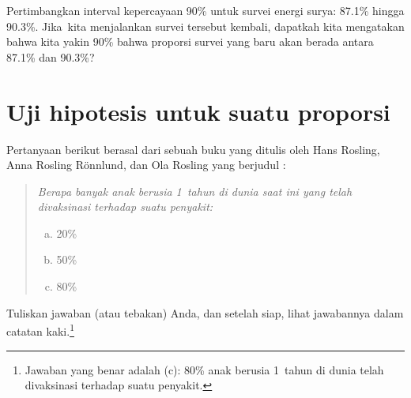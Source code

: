 \begin{exercisewrap}
\begin{nexercise}
Pertimbangkan interval kepercayaan 90\% untuk survei
energi surya: 87.1\% hingga 90.3\%.
Jika~kita menjalankan survei tersebut kembali, dapatkah kita mengatakan bahwa kita
yakin 90\% bahwa proporsi survei yang baru
akan berada antara 87.1\% dan 90.3\%?\footnotemark{}
\end{nexercise}
\end{exercisewrap}








{}







\section{Uji hipotesis untuk suatu proporsi}
\label{hypothesisTesting}


Pertanyaan berikut berasal dari sebuah buku yang ditulis oleh
Hans Rosling, Anna Rosling R{\"o}nnlund, dan Ola Rosling
yang berjudul \emph{}:
\begin{quote}
  {\em Berapa banyak anak berusia 1~tahun di dunia saat ini
  yang telah divaksinasi terhadap suatu penyakit:
  \begin{enumerate}[a.]
  \setlength{\itemsep}{0mm}
  \item 20\%
  \item 50\%
  \item 80\%
  \end{enumerate}}
\end{quote}
Tuliskan jawaban (atau tebakan) Anda,
dan setelah siap, lihat jawabannya dalam
catatan kaki.\footnote{Jawaban yang benar adalah (c):
  80\% anak berusia 1~tahun di dunia telah divaksinasi
  terhadap suatu penyakit.}

